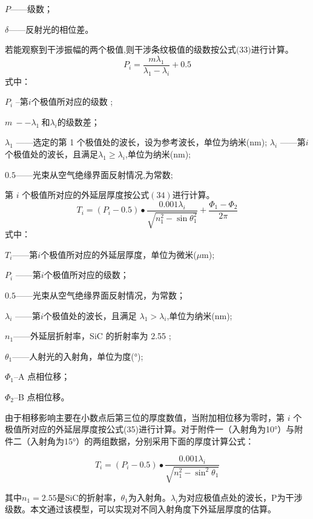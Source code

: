 \documentclass[withoutpreface,bwprint]{cumcmthesis}
\begin{document}
$P$——级数；

$\delta$——反射光的相位差。

$\text{若能观察到干涉振幅的两个极值,则干涉条纹极值的级数按公式(33)进行计算。}$
\begin{equation}
    P_i=\frac{m\lambda_1}{\lambda_1-\lambda_i}+0.5
\end{equation}
式中：

$P_i$ --第$i$个极值所对应的级数 ;

$m~--\lambda_{1}~$和$\lambda_i$的级数差；

$\lambda_1$ ——选定的第 1 个极值处的波长，设为参考波长，单位为纳米(nm);
$\lambda_i$ ——第$i$个极值处的波长，且满足$\lambda_1\geq\lambda_i$,单位为纳米(nm);

$\text{0.5——光束从空气绝缘界面反射情况,为常数;}$

$\text{第 }i\text{ 个极值所对应的外延层厚度按公式}(34)\text{进行计算。}$
\begin{equation}
    T_i=(P_i-0.5)\bullet\frac{0.001\lambda_i}{\sqrt{n_1^2-\sin\theta_1^2}}+\frac{\Phi_1-\Phi_2}{2\pi}
\end{equation}
式中：

$T_i$——第$i$个极值所对应的外延层厚度，单位为微米($\mu$m);

$P_{i}$ ——第$i$个极值所对应的级数；

$\text{0.5——光束从空气绝缘界面反射情况，为常数；}$

$\lambda_i$ ——第$i$个极值处的波长，且满足
$\lambda_1>\lambda_i$,单位为纳米(nm);

$n_1$——外延层折射率，SiC 的折射率为 2.55 ;

$\theta_1$——人射光的入射角，单位为度(°);

$\Phi_1$--A 点相位移；

$\Phi_2$--B 点相位移。

由于相移影响主要在小数点后第三位的厚度数值，当附加相位移为零时，第 $i$ 个极值所对应的外延层厚度按公式(35)进行计算。对于附件一（入射角为10°）与附件二（入射角为15°）的两组数据，分别采用下面的厚度计算公式：

\begin{equation}
    T_i=(P_i-0.5)\bullet\frac{0.001\lambda_i}{\sqrt{n_1^2-\sin^2\theta_1}}
\end{equation}

其中$n_1=2.55$是SiC的折射率，$\theta_1$为入射角。$\lambda_{i}$为对应极值点处的波长，$\text{P}$为干涉级数。本文通过该模型，可以实现对不同入射角度下外延层厚度的估算。
\end{document}
